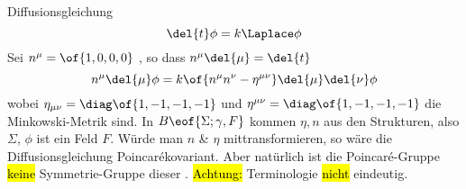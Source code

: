 \begin{beispiel}{Diffusionsgleichung}
	\begin{equation}
		\del{t} \phi = k \Laplace \phi
	\end{equation}
	Sei $n^{\mu} = \of{1,0,0,0}$ , so dass $n^{\mu} \del{\mu} = \del{t}$
	\begin{equation}
		n^{\mu}\del{\mu} \phi = k \of{n^{\mu}n^{\nu} - \eta^{\mu\nu}} \del{\mu}\del{\nu} \phi
	\end{equation}
	wobei $\eta_{\mu\nu} = \diag\of{1,-1,-1,-1}$ und $\eta^{\mu\nu} = \diag\of{1,-1,-1,-1}$ die Minkowski-Metrik sind. In $B\eof{\Sigma;\gamma,F}$ kommen $\eta,n$ aus den Strukturen, also $\Sigma$, $\phi$ ist ein Feld $F$. Würde man $n$ \& $\eta$ mittransformieren, so wäre die Diffusionsgleichung Poincarékovariant. Aber natürlich ist die Poincaré-Gruppe \hl{keine} Symmetrie-Gruppe dieser \bwg. \hl{Achtung:} Terminologie \hl{nicht} eindeutig.
\end{beispiel}


